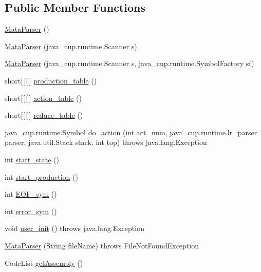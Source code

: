 \subsection*{Public Member Functions}
\begin{DoxyCompactItemize}
\item 
\hyperlink{classcas_1_1parser_1_1_mata_parser_a5c29719be1371a4780e765b361ca78c6}{Mata\-Parser} ()
\item 
\hyperlink{classcas_1_1parser_1_1_mata_parser_a128c3616b1f633dcc52d059c296a010b}{Mata\-Parser} (java\-\_\-cup.\-runtime.\-Scanner s)
\item 
\hyperlink{classcas_1_1parser_1_1_mata_parser_a99c183666b6d446fee9597df6afd2fd3}{Mata\-Parser} (java\-\_\-cup.\-runtime.\-Scanner s, java\-\_\-cup.\-runtime.\-Symbol\-Factory sf)
\item 
short\mbox{[}$\,$\mbox{]}\mbox{[}$\,$\mbox{]} \hyperlink{classcas_1_1parser_1_1_mata_parser_a3b553b038bc42f727b448c7b5c5468fb}{production\-\_\-table} ()
\item 
short\mbox{[}$\,$\mbox{]}\mbox{[}$\,$\mbox{]} \hyperlink{classcas_1_1parser_1_1_mata_parser_a6aaa814d580652feb3aa893fd06880fe}{action\-\_\-table} ()
\item 
short\mbox{[}$\,$\mbox{]}\mbox{[}$\,$\mbox{]} \hyperlink{classcas_1_1parser_1_1_mata_parser_a2bbee0284ae11462dae502564442206a}{reduce\-\_\-table} ()
\item 
java\-\_\-cup.\-runtime.\-Symbol \hyperlink{classcas_1_1parser_1_1_mata_parser_a631f41c676b2dcfa2701415af0511a66}{do\-\_\-action} (int act\-\_\-num, java\-\_\-cup.\-runtime.\-lr\-\_\-parser parser, java.\-util.\-Stack stack, int top)  throws java.\-lang.\-Exception   
\item 
int \hyperlink{classcas_1_1parser_1_1_mata_parser_a3dc5d030c718f44ad6c3dc5396b952a2}{start\-\_\-state} ()
\item 
int \hyperlink{classcas_1_1parser_1_1_mata_parser_ac30546d72f0e661426605ecdb1a64693}{start\-\_\-production} ()
\item 
int \hyperlink{classcas_1_1parser_1_1_mata_parser_a00bca4ca9c3fbe57168ad73d34fb832e}{E\-O\-F\-\_\-sym} ()
\item 
int \hyperlink{classcas_1_1parser_1_1_mata_parser_a79eefa539efa888039725c1da054a785}{error\-\_\-sym} ()
\item 
void \hyperlink{classcas_1_1parser_1_1_mata_parser_a582ff46721e8dd7d33414e117b344cfb}{user\-\_\-init} ()  throws java.\-lang.\-Exception     
\item 
\hyperlink{classcas_1_1parser_1_1_mata_parser_adf85797d8bdcf3769e91cc5a58b52098}{Mata\-Parser} (String file\-Name)  throws File\-Not\-Found\-Exception 
\item 
Code\-List \hyperlink{classcas_1_1parser_1_1_mata_parser_af819a65de07bd194e287e95b376dbfdb}{get\-Assembly} ()
\end{DoxyCompactItemize}

